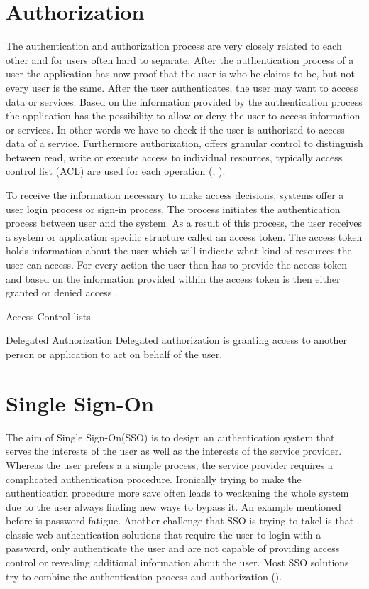 \section{Authorization}


The authentication and authorization process are very closely related to each other and for users often hard to separate. After the authentication process of a user the application has now proof that the user is who he claims to be, but not every user is the same. After  the user authenticates, the user may want to access data or services. Based on the information provided by the authentication process the application has the possibility to allow or deny the user to access information or services. In other words we have to check if the user is authorized to access data of a service. Furthermore authorization, offers granular control to distinguish between read, write or execute access to individual resources, typically access control list (ACL) are used for each operation (\cite{Todorov:2007:MUI}, \cite{Boyed:2012:GSOA}).

To receive the information necessary to make access decisions,  systems offer a user login process or sign-in process. The process initiates the authentication process between user and the system. As a result of this process, the user receives a system or application specific structure called an access token. The access token holds information about the user which will indicate what kind of resources the user can access. For every action the user then has to provide the access token and based on the information provided within the access token is then either granted or denied access \cite{Todorov:2007:MUI}. 


Access Control lists

Delegated Authorization
Delegated authorization is granting access to another person or application to act on behalf of the user.
\cite{Boyed:2012:GSOA}


\section{Single Sign-On}

The aim of Single Sign-On(SSO) is to design an authentication system that serves the interests of the user as well as the interests of the service provider. Whereas the user prefers a a simple process, the service provider requires a complicated authentication procedure. Ironically trying to make the authentication procedure more save often leads to weakening the whole system due to the user always  finding new ways to bypass it. An example mentioned before is password fatigue. Another challenge that SSO is trying to takel is that classic web authentication solutions that require the user to login with a password, only authenticate the user and are not capable of providing access control or revealing additional information about the user. Most SSO solutions try to combine the authentication process and authorization (\cite{Prochazka:2010:UCA}).

